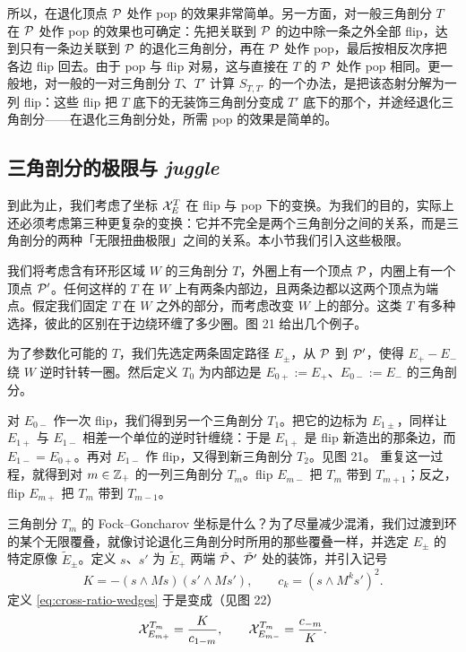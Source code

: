 所以，在退化顶点 $\mathcal{P}$ 处作 pop 的效果非常简单。另一方面，对一般三角剖分 $T$ 在 $\mathcal{P}$ 处作 pop 的效果也可确定：先把关联到 $\mathcal{P}$ 的边中除一条之外全部 flip，达到只有一条边关联到 $\mathcal{P}$ 的退化三角剖分，再在 $\mathcal{P}$ 处作 pop，最后按相反次序把各边 flip 回去。由于 pop 与 flip 对易，这与直接在 $T$ 的 $\mathcal{P}$ 处作 pop 相同。更一般地，对一般的一对三角剖分 $T$、$T'$ 计算 $S_{T,T'}$ 的一个办法，是把该态射分解为一列 flip：这些 flip 把 $T$ 底下的无装饰三角剖分变成 $T'$ 底下的那个，并途经退化三角剖分——在退化三角剖分处，所需 pop 的效果是简单的。

\subsection{三角剖分的极限与 \emph{juggle}}
\label{sec:limit-triangulation}

到此为止，我们考虑了坐标 $\mathcal{X}^T_E$ 在 flip 与 pop 下的变换。为我们的目的，实际上还必须考虑第三种更复杂的变换：它并不完全是两个三角剖分之间的关系，而是三角剖分的两种「无限扭曲极限」之间的关系。本小节我们引入这些极限。

我们将考虑含有环形区域 $W$ 的三角剖分 $T$，外圈上有一个顶点 $\mathcal{P}$，内圈上有一个顶点 $\mathcal{P}'$。任何这样的 $T$ 在 $W$ 上有两条内部边，且两条边都以这两个顶点为端点。假定我们固定 $T$ 在 $W$ 之外的部分，而考虑改变 $W$ 上的部分。这类 $T$ 有多种选择，彼此的区别在于边绕环缠了多少圈。图 21%
给出几个例子。

为了参数化可能的 $T$，我们先选定两条固定路径 $E_\pm$，从 $\mathcal{P}$ 到 $\mathcal{P}'$，使得 $E_+-E_-$ 绕 $W$ 逆时针转一圈。然后定义 $T_0$ 为内部边是 $E_{0+}:=E_+$、$E_{0-}:=E_-$ 的三角剖分。

对 $E_{0-}$ 作一次 flip，我们得到另一个三角剖分 $T_1$。把它的边标为 $E_{1\pm}$，同样让 $E_{1+}$ 与 $E_{1-}$ 相差一个单位的逆时针缠绕：于是 $E_{1+}$ 是 flip 新造出的那条边，而 $E_{1-}=E_{0+}$。再对 $E_{1-}$ 作 flip，又得到新三角剖分 $T_2$。见图 21。%
重复这一过程，就得到对 $m\in\mathbb{Z}_+$ 的一列三角剖分 $T_m$。flip $E_{m-}$ 把 $T_m$ 带到 $T_{m+1}$；反之，flip $E_{m+}$ 把 $T_m$ 带到 $T_{m-1}$。


三角剖分 $T_m$ 的 Fock--Goncharov 坐标是什么？为了尽量减少混淆，我们过渡到环的某个无限覆叠，就像讨论退化三角剖分时所用的那些覆叠一样，并选定 $E_\pm$ 的特定原像 $\tilde E_\pm$。定义 $s$、$s'$ 为 $\tilde E_+$ 两端 $\tilde{\mathcal{P}}$、$\tilde{\mathcal{P}}'$ 处的装饰，并引入记号
\begin{equation}
K = -(s\wedge Ms)(s'\wedge Ms'),\qquad c_k = (s\wedge M^k s')^2.
\end{equation}
定义 \eqref{eq:cross-ratio-wedges} 于是变成（见图 22）%
\begin{equation}
\mathcal{X}^{T_m}_{E_{m+}} = \frac{K}{c_{1-m}},\qquad \mathcal{X}^{T_m}_{E_{m-}} = \frac{c_{-m}}{K}.
\end{equation}

